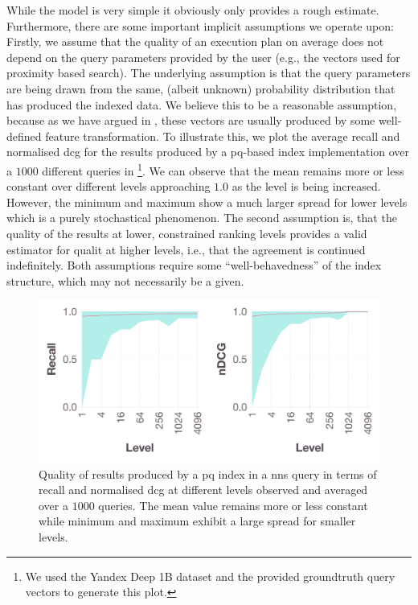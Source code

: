 While the model is very simple it obviously only provides a rough estimate. Furthermore, there are some important implicit assumptions we operate upon: Firstly, we assume that the quality of an execution plan on average does not depend on the query parameters provided by the user (e.g., the vectors used for proximity based search). The underlying assumption is that the query parameters are being drawn from the same, (albeit unknown) probability distribution that has produced the indexed data. We believe this to be a reasonable assumption, because as we have argued in , these vectors are usually produced by some well-defined feature transformation. To illustrate this, we plot the average recall and normalised \acrshort{dcg} for the results produced by a \acrshort{pq}-based index implementation over a $1000$ different queries in  \footnote{We used the Yandex Deep 1B dataset \cite{Babenko:2016Efficient} and the provided groundtruth query vectors to generate this plot.}. We can observe that the mean remains more or less constant over different levels approaching $1.0$ as the level is being increased. However, the minimum and maximum show a much larger spread for lower levels which is a purely stochastical phenomenon. The second assumption is, that the quality of the results at lower, constrained ranking levels provides a valid estimator for qualit at higher levels, i.e., that the agreement is continued indefinitely. Both assumptions require some ``well-behavedness'' of the index structure, which may not necessarily be a given.

\begin{figure}
    \centering
    \includegraphics[width=\textwidth]{figures/index-quality-pq}
    \caption{Quality of results produced by a \acrshort{pq} index in a \acrshort{nns} query in terms of recall and normalised \acrshort{dcg} at different levels observed and averaged over a $1000$ queries. The mean value remains more or less constant while minimum and maximum exhibit a large spread for smaller levels.}
    \label{figure:index_quality}
\end{figure}

